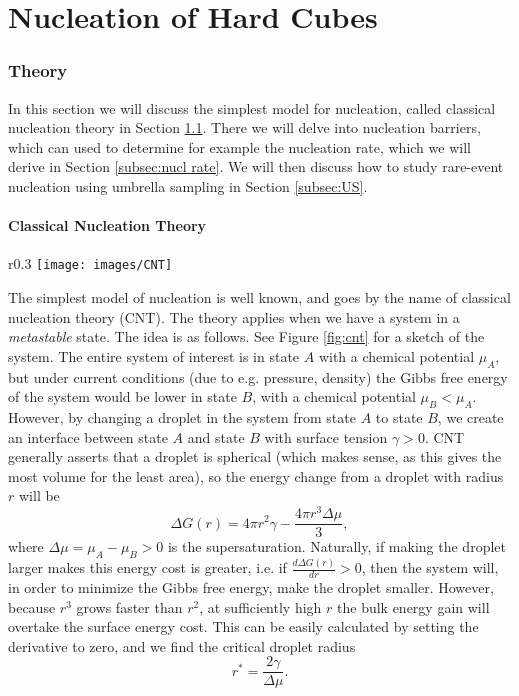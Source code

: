 \documentclass[thesis]{subfiles}
\begin{document}
\part{Nucleation of Hard Cubes}

\section{Theory}

In this section we will discuss the simplest model for nucleation, called classical nucleation theory in Section \ref{subsec:cnt}. There we will delve into nucleation barriers, which can used to determine for example the nucleation rate, which we will derive in Section \ref{subsec:nucl rate}. We will then discuss how to study rare-event nucleation using umbrella sampling in Section \ref{subsec:US}.

\subsection{Classical Nucleation Theory}\label{subsec:cnt}

\begin{wrapfigure}{r}{0.3\textwidth}
	\centering
	\vspace{-10pt}
	\texttt{[image: images/CNT]}
	\caption{A cartoon of the system described by CNT.}\label{fig:cnt}
	\vspace{-10pt}
\end{wrapfigure}

The simplest model of nucleation is well known, and goes by the name of classical nucleation theory (CNT). The theory applies when we have a system in a \emph{metastable} state. The idea is as follows. See Figure \ref{fig:cnt} for a sketch of the system. The entire system of interest is in state $A$ with a chemical potential $\mu_A$, but under current conditions (due to e.g. pressure, density) the Gibbs free energy of the system would be lower in state $B$, with a chemical potential $\mu_B < \mu_A$. However, by changing a droplet in the system from state $A$ to state $B$, we create an interface between state $A$ and state $B$ with surface tension $\gamma > 0$. CNT generally asserts that a droplet is spherical (which makes sense, as this gives the most volume for the least area), so the energy change from a droplet with radius $r$ will be	
\begin{equation}
	\Delta G(r) = 4\pi r^2 \gamma - \frac{4\pi r^3 \Delta\mu}{3},
\end{equation}
where $\Delta\mu = \mu_A - \mu_B > 0$ is the supersaturation. Naturally, if making the droplet larger makes this energy cost is greater, i.e. if $\frac{d\Delta G(r)}{dr} > 0$, %
then the system will, in order to minimize the Gibbs free energy, make the droplet smaller. However, because $r^3$ grows faster than $r^2$, at sufficiently high $r$ the bulk energy gain will overtake the surface energy cost. This can be easily calculated by setting the derivative to zero, and we find the critical droplet radius
\begin{equation}
	r^* = \frac{2\gamma}{\Delta\mu}.
\end{equation}
\end{document}
